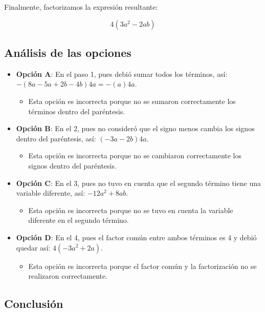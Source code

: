\documentclass[
]{article}
\providecommand{\tightlist}{%
  \setlength{\itemsep}{0pt}\setlength{\parskip}{0pt}}
\begin{document}
Finalmente, factorizamos la expresión resultante:

\[
4(3a^2 - 2ab)
\]

\subsection{Análisis de las
opciones}\label{anuxe1lisis-de-las-opciones-1}

\begin{itemize}
\tightlist
\item
  \textbf{Opción A}: En el paso 1, pues debió sumar todos los términos,
  así: \(-(8a - 5a + 2b - 4b)4a = -(a)4a\).

  \begin{itemize}
  \tightlist
  \item
    Esta opción es incorrecta porque no se sumaron correctamente los
    términos dentro del paréntesis.
  \end{itemize}
\item
  \textbf{Opción B}: En el 2, pues no consideró que el signo menos
  cambia los signos dentro del paréntesis, así: \((-3a - 2b)4a\).

  \begin{itemize}
  \tightlist
  \item
    Esta opción es incorrecta porque no se cambiaron correctamente los
    signos dentro del paréntesis.
  \end{itemize}
\item
  \textbf{Opción C}: En el 3, pues no tuvo en cuenta que el segundo
  término tiene una variable diferente, así: \(-12a^2 + 8ab\).

  \begin{itemize}
  \tightlist
  \item
    Esta opción es incorrecta porque no se tuvo en cuenta la variable
    diferente en el segundo término.
  \end{itemize}
\item
  \textbf{Opción D}: En el 4, pues el factor común entre ambos términos
  es 4 y debió quedar así: \(4(-3a^2 + 2a)\).

  \begin{itemize}
  \tightlist
  \item
    Esta opción es incorrecta porque el factor común y la factorización
    no se realizaron correctamente.
  \end{itemize}
\end{itemize}

\subsection{Conclusión}\label{conclusiuxf3n-10}
\end{document}
